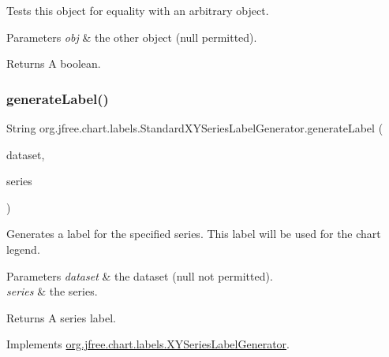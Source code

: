 Tests this object for equality with an arbitrary object.


\begin{DoxyParams}{Parameters}
{\em obj} & the other object ({\ttfamily null} permitted).\\
\hline
\end{DoxyParams}
\begin{DoxyReturn}{Returns}
A boolean. 
\end{DoxyReturn}
\mbox{\label{classorg_1_1jfree_1_1chart_1_1labels_1_1_standard_x_y_series_label_generator_a375c362db86e54c4d8180f21f18f4ffb}} 
\subsubsection{\texorpdfstring{generate\+Label()}{generateLabel()}}
{\footnotesize\ttfamily String org.\+jfree.\+chart.\+labels.\+Standard\+X\+Y\+Series\+Label\+Generator.\+generate\+Label (\begin{DoxyParamCaption}\item[{\mbox{\hyperlink{interfaceorg_1_1jfree_1_1data_1_1xy_1_1_x_y_dataset}{X\+Y\+Dataset}}}]{dataset,  }\item[{int}]{series }\end{DoxyParamCaption})}

Generates a label for the specified series. This label will be used for the chart legend.


\begin{DoxyParams}{Parameters}
{\em dataset} & the dataset ({\ttfamily null} not permitted). \\
\hline
{\em series} & the series.\\
\hline
\end{DoxyParams}
\begin{DoxyReturn}{Returns}
A series label. 
\end{DoxyReturn}


Implements \mbox{\hyperlink{interfaceorg_1_1jfree_1_1chart_1_1labels_1_1_x_y_series_label_generator_a03bdf2e5c8623657a8f6abc8f467d5b1}{org.\+jfree.\+chart.\+labels.\+X\+Y\+Series\+Label\+Generator}}.

